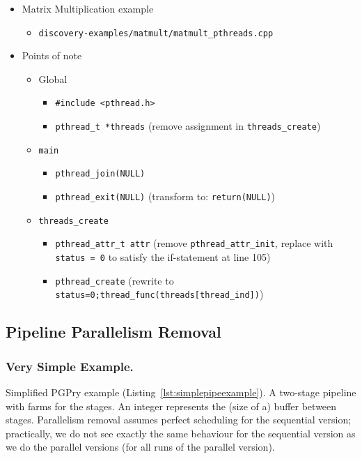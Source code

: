 \begin{itemize}
\item Matrix Multiplication example
  \begin{itemize}
  \item \texttt{discovery-examples/matmult/matmult\_pthreads.cpp}
  \end{itemize}
\item Points of note
  \begin{itemize}
  \item Global
    \begin{itemize}
    \item \lstinline|#include <pthread.h>|
    \item \lstinline|pthread_t *threads| (remove assignment in \lstinline|threads_create|)
    \end{itemize}
  \item \lstinline|main|
    \begin{itemize}
    \item \lstinline|pthread_join(NULL)|
    \item \lstinline|pthread_exit(NULL)| (transform to: \lstinline|return(NULL)|)
    \end{itemize}
  \item \lstinline|threads_create|
    \begin{itemize}
    \item \lstinline|pthread_attr_t attr| (remove \lstinline|pthread_attr_init|, replace with \lstinline|status = 0| to satisfy the if-statement at line 105)
    \item \lstinline|pthread_create| (rewrite to \lstinline|status=0;thread_func(threads[thread_ind])|)
    \end{itemize}
  \end{itemize}
\end{itemize}

\subsection{Pipeline Parallelism Removal}



\subsubsection{Very Simple Example.}

Simplified PGPry example (Listing~\ref{lst:simplepipeexample}). A two-stage pipeline with farms for the stages. An integer represents the (size of a) buffer between stages. Parallelism removal assumes perfect scheduling for the sequential version; practically, we do not see exactly the same behaviour for the sequential version as we do the parallel versions (for all runs of the parallel version).

